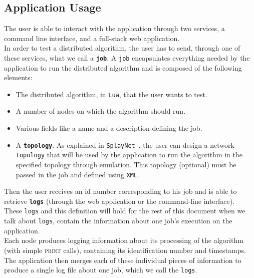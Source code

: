 \documentclass{eplmastersthesis}
\begin{document}
      \subsection{Application Usage}

        The user is able to interact with the application through two
        services, a command line interface, and a full-stack web application.\\
        In order to test a distributed algorithm, the user has to send, through
        one of these services, what we call a \textbf{\texttt{job}}. A
        \texttt{job} encapsulates everything needed by the application
        to run the distributed algorithm and is composed of the following
        elements:

        \begin{itemize}
          \item The distributed algorithm, in \texttt{Lua}, that the user wants to test.
          \item A number of nodes on which the algorithm should run.
          \item Various fields like a name and a description defining the job.
          \item A \textbf{\texttt{topology}}. As explained in
          \texttt{SplayNet}~\cite{SplayNet}, the user can design a network
          \texttt{topology} that will be used by the application
          to run the algorithm in the specified topology through emulation.
          This topology (optional) must be passed in the job and defined
          using \texttt{XML}.
        \end{itemize}

        Then the user receives an id number corresponding to his job and
        is able to retrieve \textbf{\texttt{logs}} (through the web application
        or the command-line interface).\\
        These \texttt{logs} and this
        definition will hold for the rest of this document when we talk about
        \texttt{logs}, contain the information about one job's
        execution on the application.\\
        Each node produces logging information about its processing of the
        algorithm (with simple \textsc{print} calls), containing its
        identification number and timestamps.\\
        The application then merges each of these individual pieces of information
        to produce a single log file about one job, which we
        call the \texttt{logs}.
\end{document}
